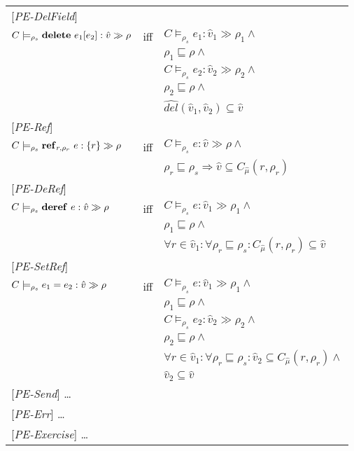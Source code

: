 \documentclass[[12pt,a4paper,twoside,openrigh]{article}
\newcommand{\vat}[0]{\hat{v}}
\newcommand{\modelrho}{\models_{\rho_s}}
\newcommand{\caesti}[2]{C \modelrho #1 : \vat_{#2} \gg \rho_{#2}}
\newcommand{\caest}[1]{C \modelrho #1 : \vat \gg \rho}
\begin{document}
\begin{tabular} {l l l}
{[\textit{PE-DelField}]}\\
$\caest {\delete {e_1} {e_2}} $& iff &$ \caesti {e_1} {1} \wedge $\\
&& $\rho_1 \sqsubseteq \rho \wedge$ \\
&& $ \caesti {e_2} {2} \wedge $ \\
&& $\rho_2 \sqsubseteq \rho \wedge$ \\
&& $\widehat{del} (\vat_1, \vat_2) \subseteq \vat$\\
{[\textit{PE-Ref}]}\\
$ C \modelrho \newref {r,\rho_r} {e} :\{r\} \gg \rho $& iff &$ \caest {e} \wedge $\\
&& $\rho_r \sqsubseteq \rho_s \Rightarrow \vat \subseteq C_{\hat{\mu}}(r, \rho_r) $ \\
{[\textit{PE-DeRef}]}\\
$\caest {\deref {e}} $& iff &$ \caesti {e} {1} \wedge $\\
&& $\rho_1 \sqsubseteq \rho \wedge$ \\
&& $\forall r \in \vat_1 : \forall \rho_r \sqsubseteq \rho_s : C_{\hat{\mu}}(r, \rho_r) \subseteq \vat$ \\
{[\textit{PE-SetRef}]}\\
$\caest {\setref {e_1} {e_2}} $& iff &$ \caesti {e} {1} \wedge $\\
&& $\rho_1 \sqsubseteq \rho \wedge$ \\
&& $ \caesti {e_2} {2} \wedge $ \\
&& $\rho_2 \sqsubseteq \rho \wedge$ \\
&& $\forall r \in \vat_1 : \forall \rho_r \sqsubseteq \rho_s : \vat_2 \subseteq C_{\hat{\mu}}(r, \rho_r) \wedge$ \\
&& $\vat_2 \subseteq \vat $ \\
{[\textit{PE-Send}]} \dots \\
{[\textit{PE-Err}]} \dots \\
{[\textit{PE-Exercise}]} \dots \\
\end{tabular}
\end{document}
